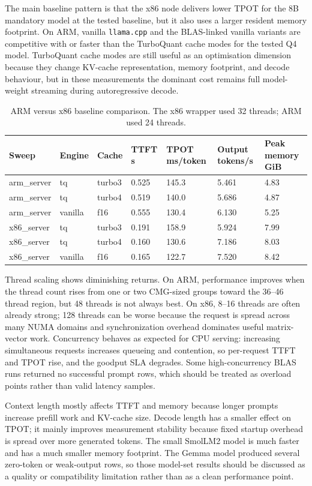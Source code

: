 \documentclass[11pt,a4paper]{article}
\begin{document}
The main baseline pattern is that the x86 node delivers lower TPOT for the
8B mandatory model at the tested baseline, but it also uses a larger resident
memory footprint. On ARM, vanilla \texttt{llama.cpp} and the BLAS-linked vanilla
variants are competitive with or faster than the TurboQuant cache modes for the
tested Q4 model. TurboQuant cache modes are still useful as an optimisation
dimension because they change KV-cache representation, memory footprint, and
decode behaviour, but in these measurements the dominant cost remains full
model-weight streaming during autoregressive decode.

\begin{table}[htbp]
\centering
\small
\begin{tabular}{lllllll}
\hline
Sweep & Engine & Cache & TTFT s & TPOT ms/token & Output tokens/s & Peak memory GiB \\
\hline
arm\_server & tq & turbo3 & 0.525 & 145.3 & 5.461 & 4.83 \\
arm\_server & tq & turbo4 & 0.519 & 140.0 & 5.686 & 4.87 \\
arm\_server & vanilla & f16 & 0.555 & 130.4 & 6.130 & 5.25 \\
x86\_server & tq & turbo3 & 0.191 & 158.9 & 5.924 & 7.99 \\
x86\_server & tq & turbo4 & 0.160 & 130.6 & 7.186 & 8.03 \\
x86\_server & vanilla & f16 & 0.165 & 122.7 & 7.520 & 8.42 \\
\hline
\end{tabular}
\caption{ARM versus x86 baseline comparison. The x86 wrapper used 32 threads; ARM used 24 threads.}
\label{tab:architecture}
\end{table}

Thread scaling shows diminishing returns. On ARM, performance improves when the
thread count rises from one or two CMG-sized groups toward the 36--46 thread
region, but 48 threads is not always best. On x86, 8--16 threads are often
already strong; 128 threads can be worse because the request is spread across
many NUMA domains and synchronization overhead dominates useful matrix-vector
work. Concurrency behaves as expected for CPU serving: increasing simultaneous
requests increases queueing and contention, so per-request TTFT and TPOT rise,
and the goodput SLA degrades. Some high-concurrency BLAS runs returned no
successful prompt rows, which should be treated as overload points rather than
valid latency samples.

Context length mostly affects TTFT and memory because longer prompts increase
prefill work and KV-cache size. Decode length has a smaller effect on TPOT; it
mainly improves measurement stability because fixed startup overhead is spread
over more generated tokens. The small SmolLM2 model is much faster and has a
much smaller memory footprint. The Gemma model produced several zero-token or
weak-output rows, so those model-set results should be discussed as a quality
or compatibility limitation rather than as a clean performance point.
\end{document}
